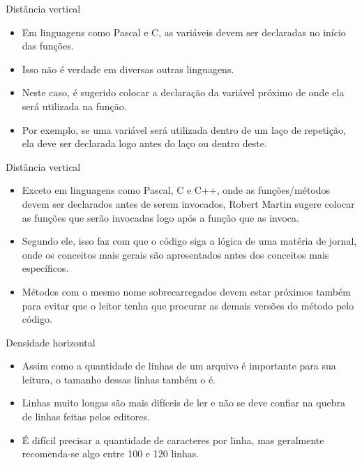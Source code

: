 \documentclass[11pt]{beamer}
\begin{document}
  \begin{frame}{Distância vertical}
    \begin{itemize}
      \item Em linguagens como Pascal e C, as variáveis devem ser declaradas no início das funções.
      \item Isso não é verdade em diversas outras linguagens.
      \item Neste caso, é sugerido colocar a declaração da variável próximo de onde ela será utilizada na função.
      \item Por exemplo, se uma variável será utilizada dentro de um laço de repetição, ela deve ser declarada logo antes do laço ou dentro deste.
    \end{itemize}
  \end{frame}

  \begin{frame}{Distância vertical}
    \begin{itemize}
      \item Exceto em linguagens como Pascal, C e C++, onde as funções/métodos devem ser declarados antes de serem invocados, Robert Martin sugere colocar as funções que serão invocadas logo após a função que as invoca.
      \item Segundo ele, isso faz com que o código siga a lógica de uma matéria de jornal, onde os conceitos mais gerais são apresentados antes dos conceitos mais específicos.
      \item Métodos com o mesmo nome sobrecarregados devem estar próximos também para evitar que o leitor tenha que procurar as demais versões do método pelo código.
    \end{itemize}
  \end{frame}

  \begin{frame}{Densidade horizontal}
    \begin{itemize}
      \item Assim como a quantidade de linhas de um arquivo é importante para sua leitura, o tamanho dessas linhas também o é.
      \item Linhas muito longas são mais difíceis de ler e não se deve confiar na quebra de linhas feitas pelos editores.
      \item É difícil precisar a quantidade de caracteres por linha, mas geralmente recomenda-se algo entre 100 e 120 linhas.
    \end{itemize}
  \end{frame}
\end{document}
